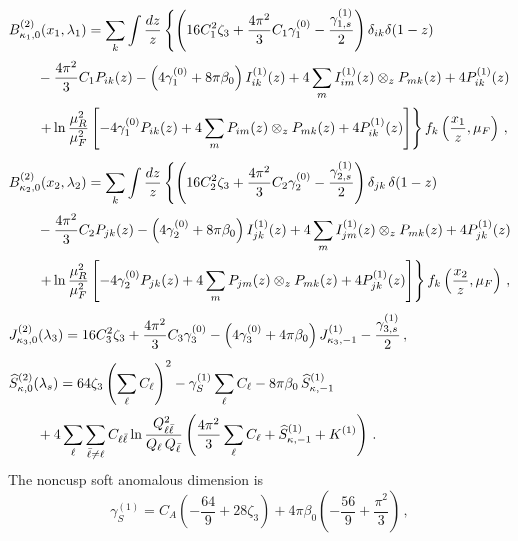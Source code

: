 \begin{subequations}
\label{eq:C20-ingred}
\begin{align}
&B_{\kappa_{1},0}^{(2)}(x_1,\lambda_1) = \sum_{k}\int\frac{dz}{z}
   \left\{ \left(16C_1^2\zeta_3+\frac{4\pi^2}{3}C_1\gamma_1^{(0)}
    -\frac{\gamma_{1,s}^{(1)}}{2}\right)\delta_{ik}\delta(1-z)
     \right.\notag\\[0.5ex]
  &\qquad-\frac{4\pi^2}{3}C_1 P_{ik}(z)-\left(4\gamma_1^{(0)}+8\pi\beta_0\right)I_{ik}^{(1)}(z)
    +4\sum_m I_{im}^{(1)}(z)\otimes_z P_{mk}(z)+4P_{ik}^{(1)}(z) \notag\\[0.5ex]
  &\qquad\left.+\ln\frac{\mu_R^2}{\mu_F^2}\left[-4\gamma_1^{(0)}P_{ik}(z)
    +4\sum_m P_{im}(z)\otimes_z P_{mk}(z)+4P_{ik}^{(1)}(z)\right]\right\}f_k\left(\frac{x_1}{z},\mu_F\right)\,, \\[1ex]
&B_{\kappa_{2},0}^{(2)}(x_2,\lambda_2) = \sum_{k}\int\frac{dz}{z}
   \left\{ \left(16C_2^2\zeta_3+\frac{4\pi^2}{3}C_2\gamma_2^{(0)}
    -\frac{\gamma_{2,s}^{(1)}}{2}\right)\delta_{jk}\,\delta(1-z)
    \right.\notag\\[0.5ex]
  &\qquad -\frac{4\pi^2}{3}C_2 P_{jk}(z)-\left(4\gamma_2^{(0)}+8\pi\beta_0\right)I_{jk}^{(1)}(z)
    +4\sum_m I_{jm}^{(1)}(z)\otimes_z P_{mk}(z)+4P_{jk}^{(1)}(z) \notag\\[0.5ex]
  &\qquad\left.+\ln\frac{\mu_R^2}{\mu_F^2}\left[-4\gamma_2^{(0)}P_{jk}(z)
    +4\sum_m P_{jm}(z)\otimes_z P_{mk}(z)+4P_{jk}^{(1)}(z)\right]\right\}f_k\left(\frac{x_2}{z},\mu_F\right)\,, \\[1ex]
    &J_{\kappa_3,0}^{(2)}(\lambda_3) = 16C_3^2\zeta_3+\frac{4\pi^2}{3}C_3\gamma_3^{(0)}
    -\left(4\gamma_3^{(0)}+4\pi\beta_0\right)J_{\kappa_3,-1}^{(1)}
    -\frac{\gamma_{3,s}^{(1)}}{2}\,, \\[1ex]
&\widehat{S}_{\kappa,0}^{(2)}(\lambda_s) =
    64\zeta_3\left(\sum_{\ell}C_{\ell}\right)^2-\gamma_S^{(1)}\sum_{\ell}C_{\ell}
    -8\pi\beta_0\,\widehat{S}_{\kappa,-1}^{(1)} \notag\\[0.5ex]
  &\qquad+4\sum_{\ell}\sum_{\bar{\ell}\neq\ell}C_{\ell\bar\ell}\ln\frac{Q_{\ell\bar{\ell}}^2}{Q_{\ell}\,Q_{\bar{\ell}}}\left(\frac{4\pi^2}{3}\sum_{\ell}C_{\ell}+\widehat{S}_{\kappa,-1}^{(1)}+K^{(1)}\right)\,.
\end{align}
\end{subequations}
The noncusp soft anomalous dimension is
\begin{equation}
\gamma_S^{(1)}
=C_A\left(-\frac{64}{9}+28\zeta_3\right)
+4\pi\beta_0\left(-\frac{56}{9}+\frac{\pi^2}{3}\right)\,,
\end{equation}

